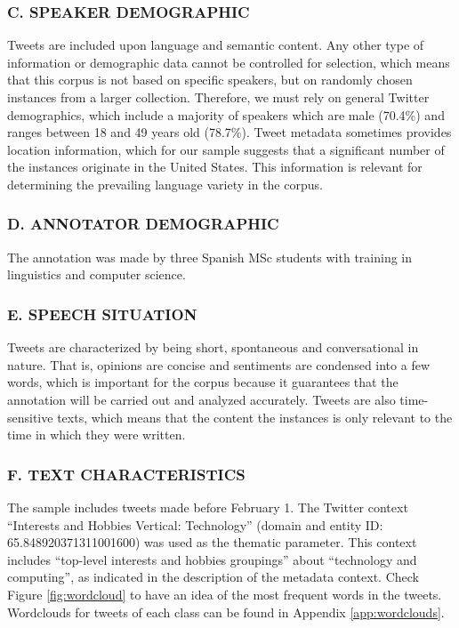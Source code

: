 \documentclass[11pt,a4paper]{article}
\begin{document}
\subsubsection*{C. SPEAKER DEMOGRAPHIC}
Tweets are included upon language and semantic content. Any other type of information or demographic data cannot be controlled for selection, which means that this corpus is not based on specific speakers, but on randomly chosen instances from a larger collection.
Therefore, we must rely on general Twitter demographics, which include a majority of speakers which are male (70.4\%) and ranges between 18 and 49 years old (78.7\%). Tweet metadata sometimes provides location information, which for our sample suggests that a significant number of the instances originate in the United States. This information is relevant for determining the prevailing language variety in the corpus.

\subsubsection*{D. ANNOTATOR DEMOGRAPHIC}
The annotation was made by three Spanish MSc students with training in linguistics and computer science.

\subsubsection*{E. SPEECH SITUATION}
Tweets are characterized by being short, spontaneous and conversational in nature. That is, opinions are concise and sentiments are condensed into a few words, which is important for the corpus because it guarantees that the annotation will be carried out and analyzed accurately. Tweets are also time-sensitive texts, which means that the content the instances is only relevant to the time in which they were written.

\subsubsection*{F. TEXT CHARACTERISTICS}
The sample includes tweets made before February 1. The Twitter context “Interests and Hobbies Vertical: Technology'' (domain and entity ID: 65.848920371311001600) was used as the thematic parameter. This context includes “top-level interests and hobbies groupings” about “technology and computing”, as indicated in the description of the metadata context. Check Figure \ref{fig:wordcloud} to have an idea of the most frequent words in the tweets. Wordclouds for tweets of each class can be found in Appendix \ref{app:wordclouds}.
\end{document}
